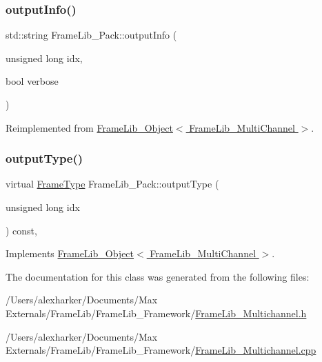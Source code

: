 \mbox{\label{class_frame_lib___pack_a40e71debefbc3e5e507e4f494e9efd68}} 
\subsubsection{\texorpdfstring{output\+Info()}{outputInfo()}}
{\footnotesize\ttfamily std\+::string Frame\+Lib\+\_\+\+Pack\+::output\+Info (\begin{DoxyParamCaption}\item[{unsigned long}]{idx,  }\item[{bool}]{verbose }\end{DoxyParamCaption})\hspace{0.3cm}{\ttfamily [virtual]}}



Reimplemented from \hyperlink{class_frame_lib___object_a6e6d79e8d620eedbaa50abf324cdedf5}{Frame\+Lib\+\_\+\+Object$<$ Frame\+Lib\+\_\+\+Multi\+Channel $>$}.

\mbox{\label{class_frame_lib___pack_a48e9118d038396653928116b5c69077f}} 
\subsubsection{\texorpdfstring{output\+Type()}{outputType()}}
{\footnotesize\ttfamily virtual \hyperlink{_frame_lib___types_8h_ad495a9f61af7fff07d7e97979d1ab854}{Frame\+Type} Frame\+Lib\+\_\+\+Pack\+::output\+Type (\begin{DoxyParamCaption}\item[{unsigned long}]{idx }\end{DoxyParamCaption}) const\hspace{0.3cm}{\ttfamily [inline]}, {\ttfamily [virtual]}}



Implements \hyperlink{class_frame_lib___object_a03eb408844f15d8f73cee67f43149b9d}{Frame\+Lib\+\_\+\+Object$<$ Frame\+Lib\+\_\+\+Multi\+Channel $>$}.



The documentation for this class was generated from the following files\+:\begin{DoxyCompactItemize}
\item 
/\+Users/alexharker/\+Documents/\+Max Externals/\+Frame\+Lib/\+Frame\+Lib\+\_\+\+Framework/\hyperlink{_frame_lib___multichannel_8h}{Frame\+Lib\+\_\+\+Multichannel.\+h}\item 
/\+Users/alexharker/\+Documents/\+Max Externals/\+Frame\+Lib/\+Frame\+Lib\+\_\+\+Framework/\hyperlink{_frame_lib___multichannel_8cpp}{Frame\+Lib\+\_\+\+Multichannel.\+cpp}\end{DoxyCompactItemize}
